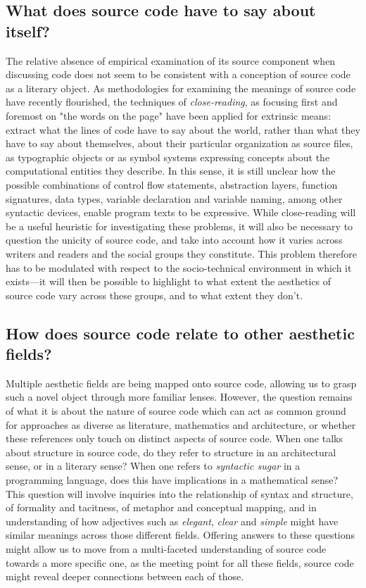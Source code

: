 \subsection{What does source code have to say about itself?}
\label{subsec:research-question-1}

The relative absence of empirical examination of its source component when discussing code does not seem to be consistent with a conception of source code as a literary object. As methodologies for examining the meanings of source code have recently flourished, the techniques of \emph{close-reading}, as focusing first and foremost on "the words on the page" \citep{richards_practical_1930} have been applied for extrinsic means: extract what the lines of code have to say about the world, rather than what they have to say about themselves, about their particular organization as source files, as typographic objects or as symbol systems expressing concepts about the computational entities they describe. In this sense, it is still unclear how the possible combinations of control flow statements, abstraction layers, function signatures, data types, variable declaration and variable naming, among other syntactic devices, enable program texts to be expressive. While close-reading will be a useful heuristic for investigating these problems, it will also be necessary to question the unicity of source code, and take into account how it varies across writers and readers and the social groups they constitute. This problem therefore has to be modulated with respect to the socio-technical environment in which it exists—it will then be possible to highlight to what extent the aesthetics of source code vary across these groups, and to what extent they don't.

\subsection{How does source code relate to other aesthetic fields?}
\label{subsec:research-question-2}

Multiple aesthetic fields are being mapped onto source code, allowing us to grasp such a novel object through more familiar lenses. However, the question remains of what it is about the nature of source code which can act as common ground for approaches as diverse as literature, mathematics and architecture, or whether these references only touch on distinct aspects of source code. When one talks about structure in source code, do they refer to structure in an architectural sense, or in a literary sense? When one refers to \emph{syntactic sugar} in a programming language, does this have implications in a mathematical sense? This question will involve inquiries into the relationship of syntax and structure, of formality and tacitness,  of metaphor and conceptual mapping, and in understanding of how adjectives such as \emph{elegant}, \emph{clear} and \emph{simple} might have similar meanings across those different fields. Offering answers to these questions might allow us to move from a multi-faceted understanding of source code towards a more specific one, as the meeting point for all these fields, source code might reveal deeper connections between each of those.

